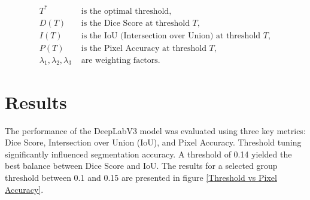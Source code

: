 \documentclass{article}
\begin{document}
\begin{align*}
T^* &\text{ is the optimal threshold,} \\
D(T) &\text{ is the Dice Score at threshold } T, \\
I(T) &\text{ is the IoU (Intersection over Union) at threshold } T, \\
P(T) &\text{ is the Pixel Accuracy at threshold } T, \\
\lambda_1, \lambda_2, \lambda_3 &\text{ are weighting factors.}
\end{align*}

\section{Results}
The performance of the DeepLabV3 model was evaluated using three key metrics: Dice Score, Intersection over Union (IoU), and Pixel Accuracy. Threshold tuning significantly influenced segmentation accuracy. A threshold of 0.14 yielded the best balance between Dice Score and IoU.  The results for a selected group threshold between 0.1 and 0.15 are presented in figure \ref{Threshold vs Pixel Accuracy}.
\end{document}
